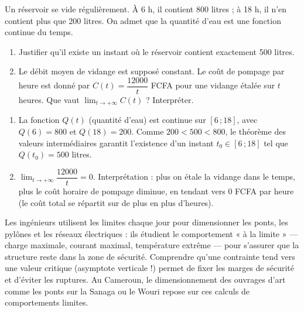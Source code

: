 \documentclass[11pt]{article}
\newcommand{\cle}[1]{{\popxbold\color{popdark}#1}}
\newcounter{popsec}
\newcounter{popsub}
\newcommand{\courssub}[1]{%
  \stepcounter{popsub}%
  \par\vspace{9pt}\noindent{\popxbold\fontsize{11.5}{13}\selectfont\color{popink}{\color{poporange}\thepopsec.\thepopsub}\hspace{6pt}#1}\par\nopagebreak\vspace{4pt}
}
\begin{document}
\begin{exercice}
Un réservoir se vide régulièrement. À 6 h, il contient 800 litres ; à 18 h, il n'en contient plus que 200 litres. On admet que la quantité d'eau est une fonction continue du temps.
\begin{enumerate}
\item Justifier qu'il existe un instant où le réservoir contient exactement 500 litres.
\item Le débit moyen de vidange est supposé constant. Le coût de pompage par heure est donné par $C(t) = \dfrac{\num{12000}}{t}$ FCFA pour une vidange étalée sur $t$ heures. Que vaut $\displaystyle\lim_{t \to +\infty} C(t)$ ? Interpréter.
\end{enumerate}
\end{exercice}

\begin{corrige}
\begin{enumerate}
\item La fonction $Q(t)$ (quantité d'eau) est continue sur $[6\,; 18]$, avec $Q(6) = 800$ et $Q(18) = 200$. Comme $200 < 500 < 800$, le théorème des valeurs intermédiaires garantit l'existence d'un instant $t_0 \in [6\,; 18]$ tel que $Q(t_0) = 500$ litres.
\item $\displaystyle\lim_{t \to +\infty} \dfrac{\num{12000}}{t} = 0$. Interprétation : plus on étale la vidange dans le temps, plus le coût horaire de pompage diminue, en tendant vers 0 FCFA par heure (le coût total se répartit sur de plus en plus d'heures).
\end{enumerate}
\end{corrige}

\courssub{Synthèse de la leçon}

\begin{savaistu}
Les ingénieurs utilisent les limites chaque jour pour \cle{dimensionner} les ponts, les pylônes et les réseaux électriques : ils étudient le comportement « à la limite » — charge maximale, courant maximal, température extrême — pour s'assurer que la structure reste dans la zone de sécurité. Comprendre qu'une contrainte tend vers une valeur critique (asymptote verticale !) permet de fixer les marges de sécurité et d'éviter les ruptures. Au Cameroun, le dimensionnement des ouvrages d'art comme les ponts sur la Sanaga ou le Wouri repose sur ces calculs de comportements limites.
\end{savaistu}
\end{document}

